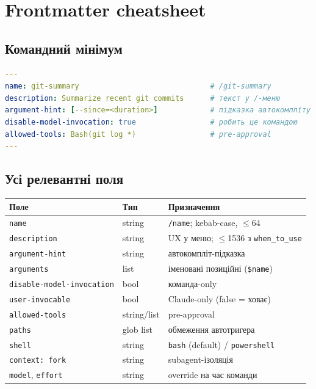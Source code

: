 \documentclass[11pt,a4paper]{article}
\begin{document}
\section{Frontmatter cheatsheet}

\subsection{Командний мінімум}

\begin{lstlisting}[language=yaml]
---
name: git-summary                              # /git-summary
description: Summarize recent git commits      # текст у /-меню
argument-hint: [--since=<duration>]            # підказка автокомпліту
disable-model-invocation: true                 # робить це командою
allowed-tools: Bash(git log *)                 # pre-approval
---
\end{lstlisting}

\subsection{Усі релевантні поля}

\begin{tabular}{lll}
\hline
\textbf{Поле} & \textbf{Тип} & \textbf{Призначення} \\
\hline
\texttt{name} & string & \texttt{/name}; kebab-case, $\le$64 \\
\texttt{description} & string & UX у меню; $\le$1536 з \texttt{when\_to\_use} \\
\texttt{argument-hint} & string & автокомпліт-підказка \\
\texttt{arguments} & list & іменовані позиційні (\texttt{\$name}) \\
\texttt{disable-model-invocation} & bool & команда-only \\
\texttt{user-invocable} & bool & Claude-only (false = ховає) \\
\texttt{allowed-tools} & string/list & pre-approval \\
\texttt{paths} & glob list & обмеження автотригера \\
\texttt{shell} & string & \texttt{bash} (default) / \texttt{powershell} \\
\texttt{context: fork} & string & subagent-ізоляція \\
\texttt{model}, \texttt{effort} & string & override на час команди \\
\hline
\end{tabular}
\end{document}
